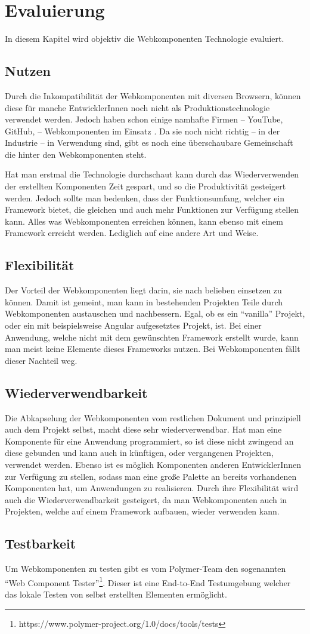 \chapter{Evaluierung}
In diesem Kapitel wird objektiv die Webkomponenten Technologie evaluiert.

\section{Nutzen}
Durch die Inkompatibilität der Webkomponenten mit diversen Browsern, können diese für manche EntwicklerInnen noch nicht als Produktionstechnologie verwendet werden. Jedoch haben schon einige namhafte Firmen -- YouTube, GitHub, \etc -- Webkomponenten im Einsatz \cite{webcomponents-production-use}. 
Da sie noch nicht richtig -- in der Industrie -- in Verwendung sind, gibt es noch eine überschaubare Gemeinschaft die hinter den Webkomponenten steht. 

Hat man erstmal die Technologie durchschaut kann durch das Wiederverwenden der erstellten Komponenten Zeit gespart, und so die Produktivität gesteigert werden. Jedoch sollte man bedenken, dass der Funktionsumfang, welcher ein Framework bietet, die gleichen und auch mehr Funktionen zur Verfügung stellen kann. Alles was Webkomponenten erreichen können, kann ebenso mit einem Framework erreicht werden. Lediglich auf eine andere Art und Weise. 

\section{Flexibilität}
Der Vorteil der Webkomponenten liegt darin, sie nach belieben einsetzen zu können. Damit ist gemeint, man kann in bestehenden Projekten Teile durch Webkomponenten austauschen und nachbessern. Egal, ob es ein "`vanilla"' Projekt, oder ein mit beispielsweise Angular aufgesetztes Projekt, ist. Bei einer Anwendung, welche nicht mit dem gewünschten Framework erstellt wurde, kann man meist keine Elemente dieses Frameworks nutzen. Bei Webkomponenten fällt dieser Nachteil weg.

\section{Wiederverwendbarkeit}
Die Abkapselung der Webkomponenten vom restlichen Dokument und prinzipiell auch dem Projekt selbst, macht diese sehr wiederverwendbar. Hat man eine Komponente für eine Anwendung programmiert, so ist diese nicht zwingend an diese gebunden und kann auch in künftigen, oder vergangenen Projekten, verwendet werden. Ebenso ist es möglich Komponenten anderen EntwicklerInnen zur Verfügung zu stellen, sodass man eine große Palette an bereits vorhandenen Komponenten hat, um Anwendungen zu realisieren. Durch ihre Flexibilität wird auch die Wiederverwendbarkeit gesteigert, da man Webkomponenten auch in Projekten, welche auf einem Framework aufbauen, wieder verwenden kann. 

\section{Testbarkeit}
Um Webkomponenten zu testen gibt es vom Polymer-Team den sogenannten "`Web Component Tester"'\footnote{https://www.polymer-project.org/1.0/docs/tools/tests}. Dieser ist eine End-to-End Testumgebung welcher das lokale Testen von selbst erstellten Elementen ermöglicht.